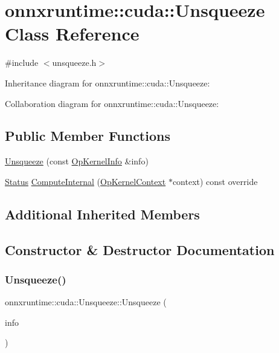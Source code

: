 \hypertarget{classonnxruntime_1_1cuda_1_1Unsqueeze}{}\section{onnxruntime\+:\+:cuda\+:\+:Unsqueeze Class Reference}
\label{classonnxruntime_1_1cuda_1_1Unsqueeze}


{\ttfamily \#include $<$unsqueeze.\+h$>$}



Inheritance diagram for onnxruntime\+:\+:cuda\+:\+:Unsqueeze\+:


Collaboration diagram for onnxruntime\+:\+:cuda\+:\+:Unsqueeze\+:
\subsection*{Public Member Functions}
\begin{DoxyCompactItemize}
\item 
\mbox{\hyperlink{classonnxruntime_1_1cuda_1_1Unsqueeze_a19a47d1e22bb1c1b1d0ee663426e104b}{Unsqueeze}} (const \mbox{\hyperlink{classonnxruntime_1_1OpKernelInfo}{Op\+Kernel\+Info}} \&info)
\item 
\mbox{\hyperlink{classonnxruntime_1_1common_1_1Status}{Status}} \mbox{\hyperlink{classonnxruntime_1_1cuda_1_1Unsqueeze_acb3d90ba25a9dbc3c4feb1af6ec4664a}{Compute\+Internal}} (\mbox{\hyperlink{classonnxruntime_1_1OpKernelContext}{Op\+Kernel\+Context}} $\ast$context) const override
\end{DoxyCompactItemize}
\subsection*{Additional Inherited Members}


\subsection{Constructor \& Destructor Documentation}
\mbox{\label{classonnxruntime_1_1cuda_1_1Unsqueeze_a19a47d1e22bb1c1b1d0ee663426e104b}} 
\subsubsection{\texorpdfstring{Unsqueeze()}{Unsqueeze()}}
{\footnotesize\ttfamily onnxruntime\+::cuda\+::\+Unsqueeze\+::\+Unsqueeze (\begin{DoxyParamCaption}\item[{const \mbox{\hyperlink{classonnxruntime_1_1OpKernelInfo}{Op\+Kernel\+Info}} \&}]{info }\end{DoxyParamCaption})\hspace{0.3cm}{\ttfamily [inline]}}



